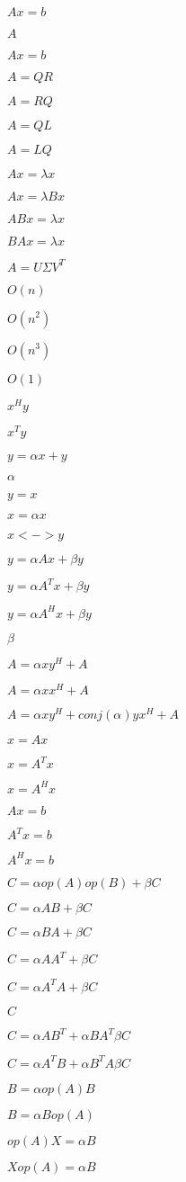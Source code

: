 \documentclass{article}
\begin{document}
$ Ax = b $
\pagebreak

$ A $
\pagebreak

$ Ax=b $
\pagebreak

$ A = QR $
\pagebreak

$ A = RQ $
\pagebreak

$ A = QL $
\pagebreak

$ A = LQ $
\pagebreak

$ Ax = \lambda x $
\pagebreak

$ Ax = \lambda Bx $
\pagebreak

$ ABx = \lambda x $
\pagebreak

$ BAx = \lambda x $
\pagebreak

$ A = U \Sigma V^T $
\pagebreak

$ O(n) $
\pagebreak

$ O(n^2) $
\pagebreak

$ O(n^3) $
\pagebreak

$ O(1) $
\pagebreak

$ x^H y $
\pagebreak

$ x^T y $
\pagebreak

$ y = \alpha x + y $
\pagebreak

$ \alpha $
\pagebreak

$ y = x $
\pagebreak

$ x = \alpha x $
\pagebreak

$ x <-> y $
\pagebreak

$ y = \alpha A x + \beta y $
\pagebreak

$ y = \alpha A^T x + \beta y $
\pagebreak

$ y = \alpha A^H x + \beta y $
\pagebreak

$ \beta $
\pagebreak

$ A = \alpha x y^H + A $
\pagebreak

$ A = \alpha x x^H + A $
\pagebreak

$ A = \alpha x y^H + conj(\alpha) y x^H + A $
\pagebreak

$ x = A x $
\pagebreak

$ x = A^T x $
\pagebreak

$ x = A^H x $
\pagebreak

$ A x = b $
\pagebreak

$ A^T x = b $
\pagebreak

$ A^H x = b $
\pagebreak

$ C = \alpha op(A) op(B) + \beta C $
\pagebreak

$ C = \alpha A B + \beta C $
\pagebreak

$ C = \alpha B A + \beta C $
\pagebreak

$ C = \alpha A A^T + \beta C $
\pagebreak

$ C = \alpha A^T A + \beta C $
\pagebreak

$ C $
\pagebreak

$ C = \alpha A B^T + \alpha B A^T \beta C $
\pagebreak

$ C = \alpha A^T B + \alpha B^T A \beta C $
\pagebreak

$ B = \alpha op(A) B $
\pagebreak

$ B = \alpha B op(A) $
\pagebreak

$ op(A) X = \alpha B $
\pagebreak

$ X op(A) = \alpha B $
\pagebreak
\end{document}
